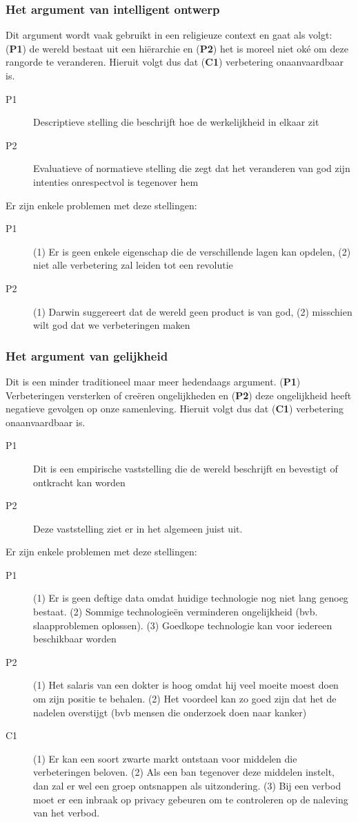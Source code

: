 \documentclass[../summary.tex]{subfiles}
\begin{document}
			\subsubsection{Het argument van intelligent ontwerp}
				Dit argument wordt vaak gebruikt in een religieuze context en gaat als volgt: (\textbf{P1}) de wereld bestaat uit een hiërarchie en (\textbf{P2}) het is moreel niet oké om deze rangorde te veranderen. Hieruit volgt dus dat (\textbf{C1}) verbetering onaanvaardbaar is. 
				\begin{description}
					\item[P1] Descriptieve stelling die beschrijft hoe de werkelijkheid in elkaar zit
					\item[P2] Evaluatieve of normatieve stelling die zegt dat het veranderen van god zijn intenties onrespectvol is tegenover hem
				\end{description}
				Er zijn enkele problemen met deze stellingen:
				\begin{description}
					\item[P1] (1) Er is geen enkele eigenschap die de verschillende lagen kan opdelen, (2) niet alle verbetering zal leiden tot een revolutie
					\item[P2] (1) Darwin suggereert dat de wereld geen product is van god, (2) misschien wilt god dat we verbeteringen maken
				\end{description}
			\subsubsection{Het argument van gelijkheid}
				Dit is een minder traditioneel maar meer hedendaags argument. (\textbf{P1}) Verbeteringen versterken of creëren ongelijkheden en (\textbf{P2}) deze ongelijkheid heeft negatieve gevolgen op onze samenleving. Hieruit volgt dus dat (\textbf{C1}) verbetering onaanvaardbaar is. 
				\begin{description}
					\item[P1] Dit is een empirische vaststelling die de wereld beschrijft en bevestigt of ontkracht kan worden
					\item[P2] Deze vaststelling ziet er in het algemeen juist uit. 
				\end{description}
				Er zijn enkele problemen met deze stellingen:
				\begin{description}
					\item[P1] (1) Er is geen deftige data omdat huidige technologie nog niet lang genoeg bestaat. (2) Sommige technologieën verminderen ongelijkheid (bvb. slaapproblemen oplossen).  (3) Goedkope technologie kan voor iedereen beschikbaar worden 
					\item[P2]  (1) Het salaris van een dokter is hoog omdat hij veel moeite moest doen om zijn positie te behalen.  (2) Het voordeel kan zo goed zijn dat het de nadelen overstijgt (bvb mensen die onderzoek doen naar kanker) 
					\item[C1] (1) Er kan een soort zwarte markt ontstaan voor middelen die verbeteringen beloven. (2) Als een ban tegenover deze middelen instelt, dan zal er wel een groep ontsnappen als uitzondering. (3) Bij een verbod moet er een inbraak op privacy gebeuren om te controleren op de naleving van het verbod.
				\end{description}
\end{document}
